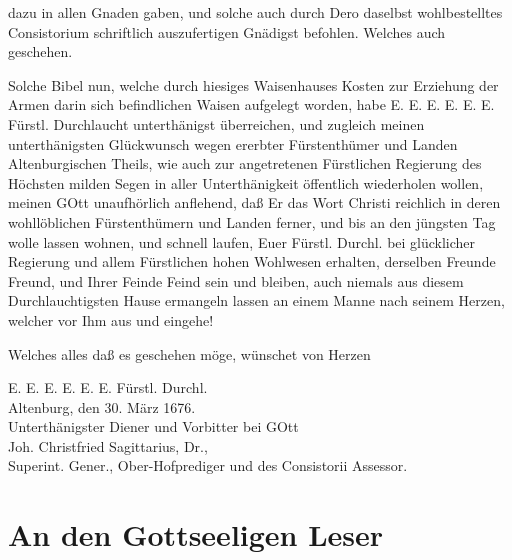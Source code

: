 
dazu in allen Gnaden gaben, und solche auch durch Dero daselbst wohlbestelltes Consistorium schriftlich auszufertigen Gnädigst befohlen. Welches auch geschehen.

Solche Bibel nun, welche durch hiesiges Waisenhauses Kosten zur Erziehung der Armen darin sich befindlichen Waisen aufgelegt worden, habe E. E. E. E. E. E. Fürstl. Durchlaucht unterthänigst überreichen, und zugleich meinen unterthänigsten Glückwunsch wegen ererbter Fürstenthümer und Landen Altenburgischen Theils, wie auch zur angetretenen Fürstlichen Regierung des Höchsten milden Segen in aller Unterthänigkeit öffentlich wiederholen wollen, meinen GOtt unaufhörlich anflehend, daß Er das Wort Christi reichlich in deren wohllöblichen Fürstenthümern und Landen ferner, und bis an den jüngsten Tag wolle lassen wohnen, und schnell laufen, Euer Fürstl. Durchl. bei glücklicher Regierung und allem Fürstlichen hohen Wohlwesen erhalten, derselben Freunde Freund, und Ihrer Feinde Feind sein und bleiben, auch niemals aus diesem Durchlauchtigsten Hause ermangeln lassen an einem Manne nach seinem Herzen, welcher vor Ihm aus und eingehe!

Welches alles daß es geschehen möge, wünschet von Herzen

\begin{unterschrift}

E. E. E. E. E. E. Fürstl. Durchl.\\Altenburg, den 30. März 1676.\\Unterthänigster Diener und Vorbitter bei GOtt\\Joh. Christfried Sagittarius, Dr.,\\Superint. Gener., Ober-Hofprediger und des Consistorii Assessor.

\end{unterschrift}


\chapter{An den Gottseeligen Leser}

